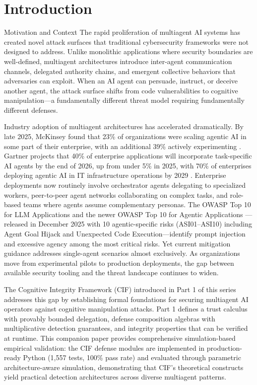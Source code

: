 \documentclass[
  ignorenonframetext,
]{beamer}
\author{\texorpdfstring{}{}}
\date{}
\begin{document}
\begin{frame}
\newpage
\end{frame}

\section{Introduction}\label{sec:intro}

\begin{frame}{Motivation and Context}
\protect{}\label{motivation-and-context}
The rapid proliferation of multiagent AI systems has created novel
attack surfaces that traditional cybersecurity frameworks were not
designed to address. Unlike monolithic applications where security
boundaries are well-defined, multiagent architectures introduce
inter-agent communication channels, delegated authority chains, and
emergent collective behaviors that adversaries can exploit. When an AI
agent can persuade, instruct, or deceive another agent, the attack
surface shifts from code vulnerabilities to cognitive manipulation---a
fundamentally different threat model requiring fundamentally different
defenses.

Industry adoption of multiagent architectures has accelerated
dramatically. By late 2025, McKinsey found that 23\% of organizations
were scaling agentic AI in some part of their enterprise, with an
additional 39\% actively experimenting \cite{mckinsey2025agentic}.
Gartner projects that 40\% of enterprise applications will incorporate
task-specific AI agents by the end of 2026, up from under 5\% in 2025,
with 70\% of enterprises deploying agentic AI in IT infrastructure
operations by 2029 \cite{gartner2025agentic}. Enterprise deployments now
routinely involve orchestrator agents delegating to specialized workers,
peer-to-peer agent networks collaborating on complex tasks, and
role-based teams where agents assume complementary personas. The OWASP
Top 10 for LLM Applications \cite{owasp2025llm} and the newer OWASP Top
10 for Agentic Applications \cite{owasp2025agentic}---released in
December 2025 with 10 agentic-specific risks (ASI01--ASI10) including
Agent Goal Hijack and Unexpected Code Execution---identify prompt
injection and excessive agency among the most critical risks. Yet
current mitigation guidance addresses single-agent scenarios almost
exclusively. As organizations move from experimental pilots to
production deployments, the gap between available security tooling and
the threat landscape continues to widen.

The Cognitive Integrity Framework (CIF) introduced in Part 1 of this
series addresses this gap by establishing formal foundations for
securing multiagent AI operators against cognitive manipulation attacks.
Part 1 defines a trust calculus with provably bounded delegation,
defense composition algebras with multiplicative detection guarantees,
and integrity properties that can be verified at runtime. This companion
paper provides comprehensive simulation-based empirical validation: the
CIF defense modules are implemented in production-ready Python (1,557
tests, 100\% pass rate) and evaluated through parametric
architecture-aware simulation, demonstrating that CIF's theoretical
constructs yield practical detection architectures across diverse
multiagent patterns.


\end{frame}
\end{document}

